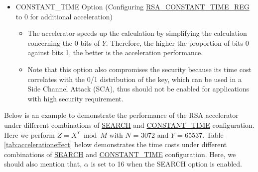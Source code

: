 \documentclass[main\_\_EN.tex]{subfiles}
\begin{document}
\begin{itemize}
\item CONSTANT\_TIME Option (Configuring \hyperref[regdesc:RSACONSTANTTIMEREG]{RSA\_CONSTANT\_TIME\_REG} to 0 for additional acceleration)
    \begin{itemize}
        \item The accelerator speeds up the calculation by simplifying the calculation concerning the 0 bits of \begin{math} Y \end{math}. Therefore, the higher the proportion of bits 0 against bits 1, the better is the acceleration performance.
        \item Note that this option also compromises the security because its time cost correlates with the 0/1 distribution of the key, which can be used in a Side Channel Attack (SCA), thus should not be enabled for applications with high security requirement.
    \end{itemize}
\end{itemize}

Below is an example to demonstrate the performance of the RSA accelerator under different combinations of \hyperref[regdesc:RSASEARCHENABLEREG]{SEARCH} and \hyperref[regdesc:RSACONSTANTTIMEREG]{CONSTANT\_TIME} configuration. Here we perform \begin{math}Z = X^{Y} \bmod M\end{math} with \begin{math}N\end{math} = 3072 and \begin{math}Y\end{math} = 65537. Table \ref{tab:accelerationeffect} below demonstrates the time costs under different combinations of \hyperref[regdesc:RSASEARCHENABLEREG]{SEARCH} and \hyperref[regdesc:RSACONSTANTTIMEREG]{CONSTANT\_TIME} configuration. Here, we should also mention that, \begin{math} \alpha \end{math} is set to 16 when the SEARCH option is enabled.
\end{document}
